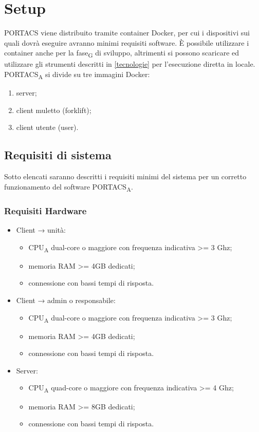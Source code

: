 \section{Setup}
PORTACS viene distribuito tramite container Docker, per cui i dispositivi sui quali dovrà eseguire avranno minimi requisiti software. È possibile utilizzare i container anche per la fase\textsubscript{G} di sviluppo, altrimenti si possono scaricare ed utilizzare gli strumenti descritti in \ref{tecnologie} per l'esecuzione diretta in locale. PORTACS\textsubscript{A} si divide su tre immagini Docker:
\begin{enumerate}
    \item server;
    \item client muletto (forklift);
    \item client utente (user).
\end{enumerate}


\subsection{Requisiti di sistema}
Sotto elencati saranno descritti i requisiti minimi del sistema per un corretto funzionamento del software PORTACS\textsubscript{A}.


\subsubsection{Requisiti Hardware}
\begin{itemize}
	\item Client → unità:
\begin{itemize}
	\item CPU\textsubscript{A} dual-core o maggiore con frequenza indicativa >= 3 Ghz;
	\item memoria RAM >= 4GB dedicati;
	\item connessione con bassi tempi di risposta.
\end{itemize}
	\item Client → admin o responsabile:
\begin{itemize}
	\item CPU\textsubscript{A} dual-core o maggiore con frequenza indicativa >= 3 Ghz;
	\item memoria RAM >= 4GB dedicati;
	\item connessione con bassi tempi di risposta.
\end{itemize}
	\item Server:
\begin{itemize}
	\item CPU\textsubscript{A} quad-core o maggiore con frequenza indicativa >= 4 Ghz;
	\item memoria RAM >= 8GB dedicati;
	\item connessione con bassi tempi di risposta.
\end{itemize}
\end{itemize}

